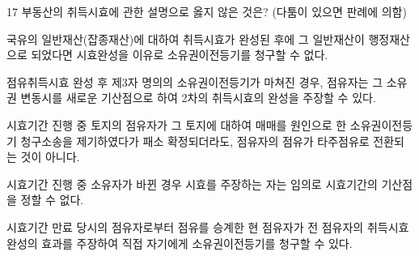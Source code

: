 \begin{question}{17}
부동산의 취득시효에 관한 설명으로 옳지 않은 것은? (다툼이 있으면 판례에 의함)
\begin{choices}
  \item 국유의 일반재산(잡종재산)에 대하여 취득시효가 완성된 후에 그 일반재산이 행정재산으로 되었다면 시효완성을 이유로 소유권이전등기를 청구할 수 없다.
  \item 점유취득시효 완성 후 제3자 명의의 소유권이전등기가 마쳐진 경우, 점유자는 그 소유권 변동시를 새로운 기산점으로 하여 2차의 취득시효의 완성을 주장할 수 있다.
  \item 시효기간 진행 중 토지의 점유자가 그 토지에 대하여 매매를 원인으로 한 소유권이전등기 청구소송을 제기하였다가 패소 확정되더라도, 점유자의 점유가 타주점유로 전환되는 것이 아니다.
  \item 시효기간 진행 중 소유자가 바뀐 경우 시효를 주장하는 자는 임의로 시효기간의 기산점을 정할 수 없다.
  \item 시효기간 만료 당시의 점유자로부터 점유를 승계한 현 점유자가 전 점유자의 취득시효 완성의 효과를 주장하여 직접 자기에게 소유권이전등기를 청구할 수 있다.
\end{choices}
\end{question}
